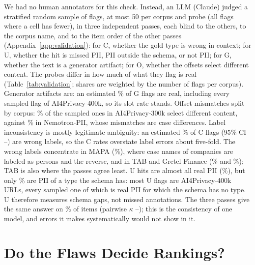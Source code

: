 \documentclass[11pt]{article}
\begin{document}
We had no human annotators for this check. Instead, an LLM (Claude)
judged a stratified random sample of  flags, at most 50
per corpus and probe (all flags where a cell has fewer), in three independent passes, each blind to the
others, to the corpus name, and to the item order of the other passes
(Appendix~\ref{app:validation}): for C, whether the gold type is wrong
in context; for U, whether the hit is missed PII, PII outside the
schema, or not PII; for G, whether the text is a generator artifact;
for O, whether the offsets select different content.
The probes differ in how much of what they flag is real
(Table~\ref{tab:validation}; shares are weighted by the number of
flags per corpus). Generator artifacts are: an estimated
\% of G flags are real, including every sampled flag of
AI4Privacy-400k, so its slot rate stands. Offset mismatches split by
corpus: \% of the sampled ones in
AI4Privacy-300k select different content, against
\% in Nemotron-PII, whose mismatches are case
differences. Label inconsistency is mostly legitimate ambiguity:
an estimated \% of C flags (95\% CI
--) are wrong labels, so the C rates
overstate label errors about five-fold.
The wrong labels concentrate in MAPA (\%), where
case names of companies are labeled as persons and the reverse, and in
TAB and Gretel-Finance (\% and
\%); TAB is also where the passes agree
least. U hits are almost all real PII (\%), but
only \% are PII of a type the schema has: most U flags
are AI4Privacy-400k URLs, every sampled one of which is real PII for
which the schema has no type. U therefore measures schema gaps, not
missed annotations. The three
passes give the same answer on \% of items (pairwise
$\kappa$ --); this is the consistency
of one model, and errors it makes systematically would not show in it.

\section{Do the Flaws Decide Rankings?}
\label{sec:consequences}
\end{document}
